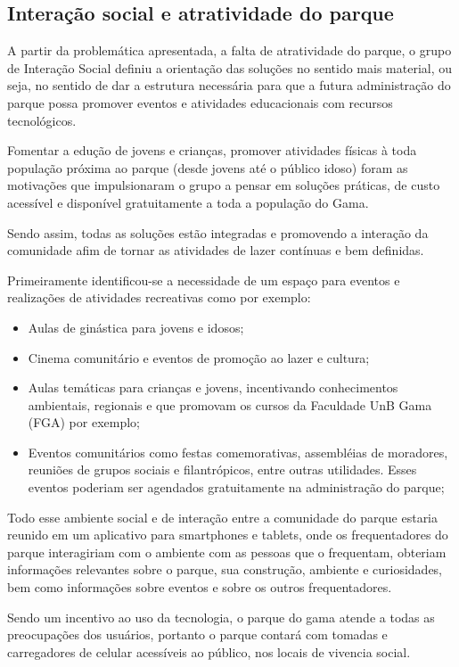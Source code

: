 \subsection{Interação social e atratividade do parque}

	A partir da problemática apresentada, a falta de atratividade do parque, o grupo de Interação Social definiu a orientação das soluções no sentido mais material, ou seja, no sentido de dar a estrutura necessária para que a futura administração do parque possa promover eventos e atividades educacionais com recursos tecnológicos.

	Fomentar a edução de jovens e crianças, promover atividades físicas à toda população próxima ao parque (desde jovens até o público idoso) foram as motivações que impulsionaram o grupo a pensar em soluções práticas, de custo acessível e disponível gratuitamente a toda a população do Gama.

	Sendo assim, todas as soluções estão integradas e promovendo a interação da comunidade afim de tornar as atividades de lazer contínuas e bem definidas.
	
	Primeiramente identificou-se a necessidade de um espaço para eventos e realizações de atividades recreativas como por exemplo:

\begin{itemize}
	\item Aulas de ginástica para jovens e idosos;
	\item Cinema comunitário e eventos de promoção ao lazer e cultura;
	\item Aulas temáticas para crianças e jovens, incentivando conhecimentos ambientais, regionais e que promovam os cursos da Faculdade UnB Gama (FGA) por exemplo;
	\item Eventos comunitários como festas comemorativas, assembléias de moradores, reuniões de grupos sociais e filantrópicos, entre outras utilidades. Esses eventos poderiam ser agendados gratuitamente na administração do parque;
\end{itemize}

	Todo esse ambiente social e de interação entre a comunidade do parque estaria reunido em um aplicativo para smartphones e tablets, onde os frequentadores do parque interagiriam com o ambiente com as pessoas que o frequentam, obteriam informações relevantes sobre o parque, sua construção, ambiente e curiosidades, bem como informações sobre eventos e sobre os outros frequentadores.

	Sendo um incentivo ao uso da tecnologia, o parque do gama atende a todas as preocupações dos usuários, portanto o parque contará com tomadas e carregadores de celular acessíveis ao público, nos locais de vivencia social.

